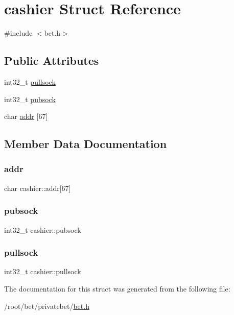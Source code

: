 \hypertarget{structcashier}{}\section{cashier Struct Reference}
\label{structcashier}


{\ttfamily \#include $<$bet.\+h$>$}

\subsection*{Public Attributes}
\begin{DoxyCompactItemize}
\item 
int32\+\_\+t \hyperlink{structcashier_a0b5bb840a70a75c97b3a2ea956e38d74}{pullsock}
\item 
int32\+\_\+t \hyperlink{structcashier_a446347ed86dea33ee1b83be7b78fe4c9}{pubsock}
\item 
char \hyperlink{structcashier_ac1cabcc8e9aad13e98becac8c3effccb}{addr} \mbox{[}67\mbox{]}
\end{DoxyCompactItemize}


\subsection{Member Data Documentation}
\mbox{\label{structcashier_ac1cabcc8e9aad13e98becac8c3effccb}} 
\subsubsection{\texorpdfstring{addr}{addr}}
{\footnotesize\ttfamily char cashier\+::addr\mbox{[}67\mbox{]}}

\mbox{\label{structcashier_a446347ed86dea33ee1b83be7b78fe4c9}} 
\subsubsection{\texorpdfstring{pubsock}{pubsock}}
{\footnotesize\ttfamily int32\+\_\+t cashier\+::pubsock}

\mbox{\label{structcashier_a0b5bb840a70a75c97b3a2ea956e38d74}} 
\subsubsection{\texorpdfstring{pullsock}{pullsock}}
{\footnotesize\ttfamily int32\+\_\+t cashier\+::pullsock}



The documentation for this struct was generated from the following file\+:\begin{DoxyCompactItemize}
\item 
/root/bet/privatebet/\hyperlink{bet_8h}{bet.\+h}\end{DoxyCompactItemize}
